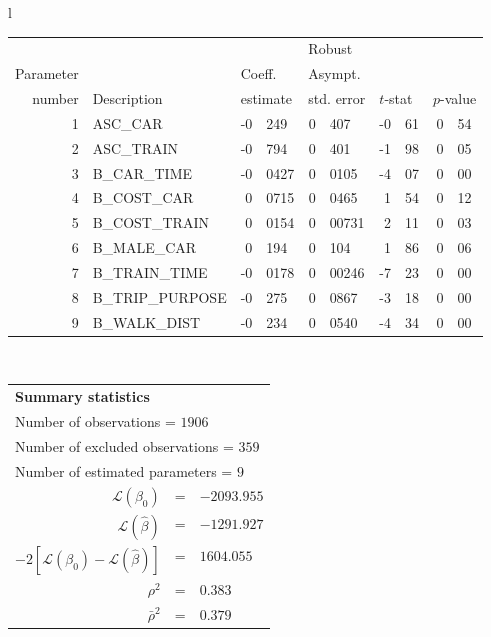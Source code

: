   \begin{tabular}{l}
\begin{tabular}{rlr@{.}lr@{.}lr@{.}lr@{.}l}
         &                       &   \multicolumn{2}{l}{}    & \multicolumn{2}{l}{Robust}  &     \multicolumn{4}{l}{}   \\
Parameter &                       &   \multicolumn{2}{l}{Coeff.}      & \multicolumn{2}{l}{Asympt.}  &     \multicolumn{4}{l}{}   \\
number &  Description                     &   \multicolumn{2}{l}{estimate}      & \multicolumn{2}{l}{std. error}  &   \multicolumn{2}{l}{$t$-stat}  &   \multicolumn{2}{l}{$p$-value}   \\

\hline

1 & ASC_CAR & -0&249 & 0&407 & -0&61 & 0&54\\
2 & ASC_TRAIN & -0&794 & 0&401 & -1&98 & 0&05\\
3 & B_CAR_TIME & -0&0427 & 0&0105 & -4&07 & 0&00\\
4 & B_COST_CAR & 0&0715 & 0&0465 & 1&54 & 0&12\\
5 & B_COST_TRAIN & 0&0154 & 0&00731 & 2&11 & 0&03\\
6 & B_MALE_CAR & 0&194 & 0&104 & 1&86 & 0&06\\
7 & B_TRAIN_TIME & -0&0178 & 0&00246 & -7&23 & 0&00\\
8 & B_TRIP_PURPOSE & -0&275 & 0&0867 & -3&18 & 0&00\\
9 & B_WALK_DIST & -0&234 & 0&0540 & -4&34 & 0&00\\
\hline
\end{tabular}
\\
\begin{tabular}{rcl}
\multicolumn{3}{l}{\bf Summary statistics}\\
\multicolumn{3}{l}{ Number of observations = $1906$} \\
\multicolumn{3}{l}{ Number of excluded observations = $359$} \\
\multicolumn{3}{l}{ Number of estimated  parameters = $9$} \\
 $\mathcal{L}(\beta_0)$ &=&  $-2093.955$ \\
 $\mathcal{L}(\hat{\beta})$ &=& $-1291.927 $  \\
 $-2[\mathcal{L}(\beta_0) -\mathcal{L}(\hat{\beta})]$ &=& $1604.055$ \\
    $\rho^2$ &=&   $0.383$ \\
    $\bar{\rho}^2$ &=&    $0.379$ \\
\end{tabular}
  \end{tabular}
